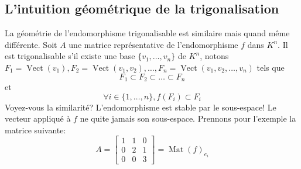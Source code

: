 \subsection{L'intuition géométrique de la trigonalisation}
La géométrie de l'endomorphisme trigonalisable est similaire mais quand même différente. Soit $A$ une matrice représentative de l'endomorphisme  $f$ dans  $K^n$. Il est trigonalisable s'il existe une base  $\{v_1, \ldots, v_n\}$ de $K^n$, notons  $F_1 = \operatorname{Vect}(v_1), F_2 = \operatorname{Vect}(v_1, v_2), \ldots, F_n = \operatorname{Vect}(v_1, v_2, \ldots, v_n)$ tels que
\[
F_1 \subset F_2 \subset \ldots \subset F_n
\] 
et 
\[
    \forall i \in \{1, \ldots, n\}, f(F_i) \subset F_i
\] 
Voyez-vous la similarité? L'endomorphisme est stable par le sous-espace! Le vecteur appliqué à $f$ ne quite jamais son sous-espace. Prennons pour l'exemple la matrice suivante:
\[
    A = \begin{bmatrix} 
        1 & 1 & 0\\
        0 & 2 & 1\\
        0 & 0 & 3
    \end{bmatrix} = \operatorname{Mat}(f)_{e_i}
\] 

